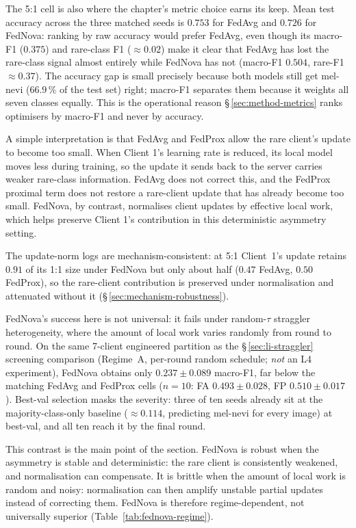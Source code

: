 \documentclass[11pt,a4paper]{report}
\begin{document}
The 5:1 cell is also where the chapter's metric choice earns its keep. Mean
test accuracy across the three matched seeds is $0.753$ for FedAvg and
$0.726$ for FedNova: ranking by raw accuracy would prefer FedAvg, even
though its macro-F1 ($0.375$) and rare-class F1 ($\approx 0.02$) make it
clear that FedAvg has lost the rare-class signal almost entirely while
FedNova has not (macro-F1 $0.504$, rare-F1 $\approx 0.37$). The accuracy
gap is small precisely because both models still get mel-nevi
($66.9\,\%$ of the test set) right; macro-F1 separates them because it
weights all seven classes equally. This is the operational reason \S\,\ref{sec:method-metrics}
ranks optimisers by macro-F1 and never by accuracy.

A simple interpretation is that FedAvg and FedProx allow the rare client's
update to become too small. When Client 1's learning rate is reduced, its
local model moves less during training, so the update it sends back to the
server carries weaker rare-class information. FedAvg does not correct this,
and the FedProx proximal term does not restore a rare-client update that has
already become too small. FedNova, by contrast, normalises client updates by
effective local work, which helps preserve Client 1's contribution in this
deterministic asymmetry setting.

The update-norm logs are mechanism-consistent: at 5:1 Client~1's update retains
$0.91$ of its 1:1 size under FedNova but only about half ($0.47$ FedAvg, $0.50$
FedProx), so the rare-client contribution is preserved under normalisation and
attenuated without it (\S\,\ref{sec:mechanism-robustness}).

FedNova's success here is not universal: it fails under random-$\tau$ straggler
heterogeneity, where the amount of local work varies randomly from round to
round. On the same 7-client engineered partition as the
\S\,\ref{sec:li-straggler} screening comparison (Regime~A, per-round random
schedule; \emph{not} an L4 experiment), FedNova obtains only
$0.237 \pm 0.089$ macro-F1, far below the matching FedAvg and FedProx cells
($n = 10$: FA $0.493 \pm 0.028$, FP $0.510 \pm 0.017$). Best-val selection masks
the severity: three of ten seeds already sit at the majority-class-only baseline
($\approx 0.114$, predicting mel-nevi for every image) at best-val, and all ten
reach it by the final round.

This contrast is the main point of the section. FedNova is robust when the
asymmetry is stable and deterministic: the rare client is consistently
weakened, and normalisation can compensate. It is brittle when the amount of
local work is random and noisy: normalisation can then amplify unstable
partial updates instead of correcting them. FedNova is therefore
regime-dependent, not universally superior
(Table~\ref{tab:fednova-regime}).
\end{document}
